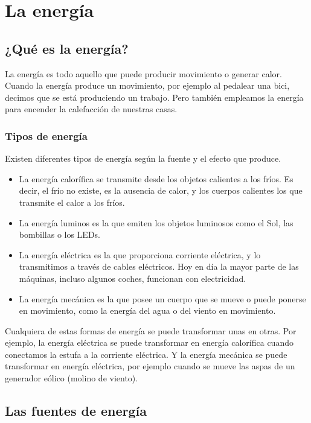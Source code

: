 \chapter{La energía}


\section{¿Qué es la energía?}

La energía es todo aquello que puede producir movimiento o generar calor. Cuando la energía produce un movimiento, por ejemplo al pedalear una bici, decimos que se está produciendo un trabajo. Pero también empleamos la energía para encender la calefacción de nuestras casas.

\subsection{Tipos de energía}

Existen diferentes tipos de energía según la fuente y el efecto que produce.
\begin{itemize}
	\item{La energía calorífica se transmite desde los objetos calientes a los fríos. Es decir, el frío no existe, es la ausencia de calor, y los cuerpos calientes los que transmite el calor a los fríos.}
	\item{La energía luminos es la que emiten los objetos luminosos como el Sol, las bombillas o los LEDs.}
	\item{La energía eléctrica es la que proporciona corriente eléctrica, y lo transmitimos a través de cables eléctricos. Hoy en día la mayor parte de las máquinas, incluso algunos coches, funcionan con electricidad.}
	\item{La energía mecánica es la que posee un cuerpo que se mueve o puede ponerse en movimiento, como la energía del agua o del viento en movimiento.}
\end{itemize}


Cualquiera de estas formas de energía se puede transformar unas en otras. Por ejemplo, la energía eléctrica se puede transformar en energía calorífica cuando conectamos la estufa a la corriente eléctrica. Y la energía mecánica se puede transformar en energía eléctrica, por ejemplo cuando se mueve las aspas de un generador eólico (molino de viento).


\section{Las fuentes de energía}

